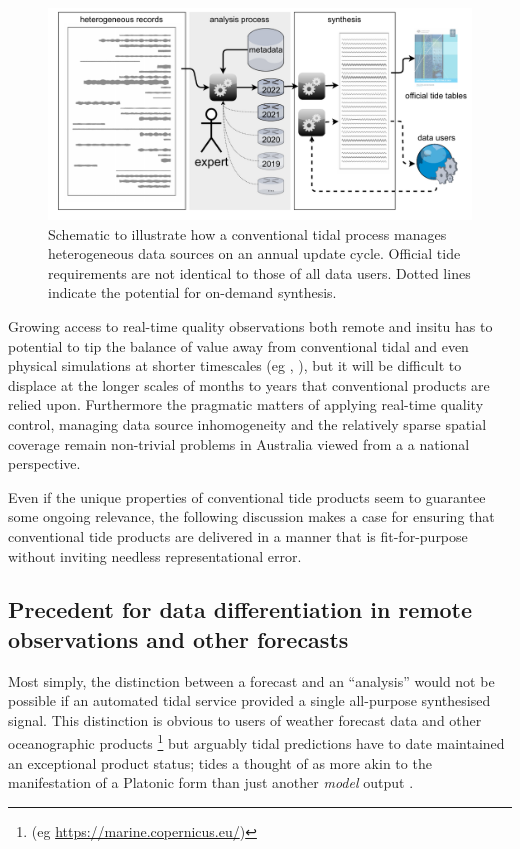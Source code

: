 \begin{figure}[H]\centering
        \includegraphics[width=\figwidthFull]{figures/diagrams/tideSchematic.pdf} 
        \caption{Schematic to illustrate how a conventional tidal process manages heterogeneous data sources on an annual update cycle.  Official tide requirements are not identical to those of all data users.  Dotted lines indicate the potential for on-demand synthesis.}
        \label{fig:tidePractice}
\end{figure}   


Growing access to real-time quality observations both remote and insitu has to potential to tip the balance of value away from conventional tidal and even physical simulations at shorter timescales (eg \citep{10.3389/fmars.2019.00437}, \citep{10.3389/fmars.2020.00260} ), but it will be difficult to displace at the longer scales of months to years that conventional products are relied upon.
Furthermore the pragmatic matters of applying real-time quality control, managing data source inhomogeneity and the relatively sparse spatial coverage remain non-trivial problems in Australia viewed from a a national perspective.


Even if the unique properties of conventional tide products seem to guarantee some ongoing relevance, the following discussion makes a case for ensuring that conventional tide products are delivered in a manner that is fit-for-purpose without inviting needless representational error. 


\subsection{Precedent for data differentiation in remote observations and other forecasts}

Most simply, the distinction between a forecast and an ``analysis'' would not be possible if an automated tidal service provided a single all-purpose synthesised signal.
This distinction is obvious to users of weather forecast data and other oceanographic products \footnote{(eg \url{https://marine.copernicus.eu/})} but arguably tidal predictions have to date maintained an exceptional product status; tides a thought of as more akin to the manifestation of a Platonic form than just another \textit{model} output \citep{Jay:2003bj} \citep{10.1029/2018rg000636}.


